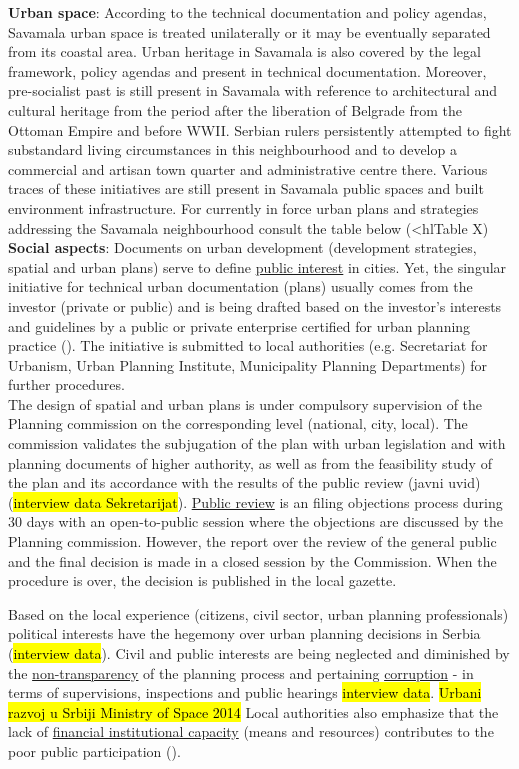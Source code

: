\documentclass[11pt]{report}
\begin{document}
\begin{itemize}
\textbf{Urban space}:
According to the technical documentation and policy agendas, Savamala urban space is treated unilaterally or it may be eventually separated from its coastal area.
Urban heritage in Savamala is also covered by the legal framework, policy agendas and present in technical documentation.
Moreover, pre-socialist past is still present in Savamala with reference to architectural and cultural heritage from the period after the liberation of Belgrade from the Ottoman Empire and before WWII.
Serbian rulers persistently attempted to fight substandard living circumstances in this neighbourhood and to develop a commercial and artisan town quarter and administrative centre there.
Various traces of these initiatives are still present in Savamala public spaces and built environment infrastructure.  
For currently in force urban plans and strategies addressing the Savamala neighbourhood consult the table below (<hl{Table X}) %
\\

\textbf{Social aspects}:
Documents on urban development (development strategies, spatial and urban plans) serve to define  \underline{public interest} in cities.
Yet, the singular initiative for technical urban documentation (plans) usually comes from the investor (private or public) and is being drafted based on the investor's interests and guidelines by a public or private enterprise certified for urban planning practice (\cite{Urbani razvoj u Srbiji Ministry of Space 2014}). The initiative is submitted to local authorities (e.g. Secretariat for Urbanism, Urban Planning Institute, Municipality Planning Departments) for further procedures.
\\
The design of spatial and urban plans is under compulsory supervision of the Planning commission on the corresponding level (national, city, local). The commission validates the subjugation of the plan with urban legislation and with planning documents of higher authority, as well as from the feasibility study of the plan and its accordance with the results of the public review (javni uvid) (\hl{interview data Sekretarijat}). 
\underline{Public review} is an filing objections process during 30 days with an open-to-public session where the objections are discussed by the Planning commission. However, the report over the review of the general public and the final decision is made in a closed session by the Commission. 
When the procedure is over, the decision is published in the local gazette.

Based on the local experience (citizens, civil sector, urban planning professionals) political interests have the hegemony over urban planning decisions in Serbia (\hl{interview data}).
Civil and public interests are being neglected and diminished by the \underline{non-transparency} of the planning process and pertaining \underline{corruption} - in terms of supervisions, inspections and public hearings \hl{interview data}.
\hl{Urbani razvoj u Srbiji Ministry of Space 2014}
Local authorities also emphasize that the lack of \underline{financial institutional capacity} (means and resources) contributes to the poor public participation (\cite{Urbani razvoj u Srbiji Ministry of Space 2014}).


\end{itemize}
\end{document}
